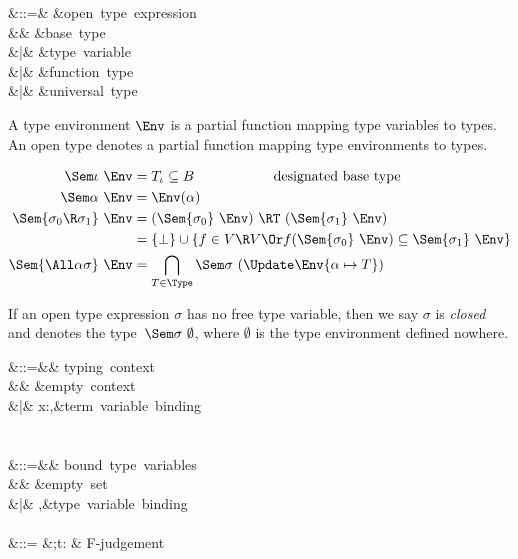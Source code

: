 \documentclass{amsart}
\begin{document}

\begin{syntax}
\sigma &::=& &\mbox{open type expression}\\
&& \iota &\mbox{base type}\\
&|& \alpha &\mbox{type variable}\\
&|& \sigma\R\sigma &\mbox{function type}\\
&|& \All\alpha\sigma &\mbox{universal type}
\end{syntax}%


A type environment $\Env$ is a partial function mapping type
variables to types. An open type denotes a partial function
mapping type environments to types.

\begin{align*}
\Sem\iota~\Env &= T_\iota \subseteq B\hspace{2cm}\mbox{designated base type}\\
\Sem\alpha~\Env &= \Env(\alpha)\\
\Sem{\sigma_0\R\sigma_1}~\Env &= (\Sem{\sigma_0}~\Env)\ \RT\ (\Sem{\sigma_1}~\Env)\\
&=\{\bot\}\cup\{f\in V\R V\Or f(\Sem{\sigma_0}~\Env)\subseteq\Sem{\sigma_1}~\Env\}\\
\Sem{\All\alpha\sigma}~\Env &=
\bigcap_{T\in\Type} \Sem\sigma~(\Update\Env{\alpha\mapsto T})
\end{align*}

If an open type expression $\sigma$ has no free type variable,
then we say $\sigma$ is \emph{closed} and denotes the
type~$\Sem\sigma~\emptyset$, where $\emptyset$ is the type
environment defined nowhere.



\begin{syntax}
\Gamma &::=&& \mbox{typing context}\\
&& \emptyset &\mbox{empty context}\\
&|& x:\sigma,\Gamma &\mbox{term variable binding}\\
\\\\
\Delta &::=&& \mbox{bound type variables}\\
&& \emptyset &\mbox{empty set}\\
&|& \alpha,\Delta &\mbox{type variable binding}
\\\\
\JF &::=
&\Gamma;\Delta\vdash t:\sigma
& \mbox{F-judgement}
\end{syntax}
\end{document}
